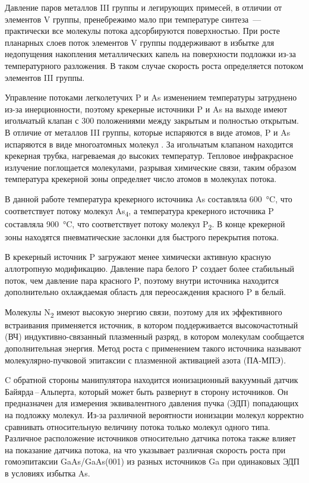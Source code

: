 Давление паров металлов III группы и легирующих примесей, в отличии от элементов V группы, пренебрежимо мало при температуре синтеза~--- практически все молекулы потока адсорбируются поверхностью. При росте планарных слоев поток элементов V группы поддерживают в избытке для недопущения накопления металлических капель на поверхности подложки из-за температурного разложения. В таком случае скорость роста определяется потоком элементов III группы.

Управление потоками легколетучих P и As изменением температуры затруднено из-за инерционности, поэтому крекерные источники P и As на выходе имеют игольчатый клапан с 300 положениями между закрытым и полностью открытым. В отличие от металлов III группы, которые испаряются в виде атомов, P и As испаряются в виде многоатомных молекул \cite{Neave1980}. За игольчатым клапаном находится крекерная трубка, нагреваемая до высоких температур. Тепловое инфракрасное излучение поглощается молекулами, разрывая химические связи, таким образом температура крекерной зоны определяет число атомов в молекулах потока.

В данной работе температура крекерного источника As составляла 600~\si{\degreeCelsius}, что соответствует потоку молекул As\textsubscript{4}, а температура крекерного источника P составляла 900~\si{\degreeCelsius}, что соответствует потоку молекул P\textsubscript{2}. В конце крекерной зоны находятся пневматические заслонки для быстрого перекрытия потока.

В крекерный источник P загружают менее химически активную красную аллотропную модификацию. Давление пара белого P создает более стабильный поток, чем давление пара красного P, поэтому внутри источника находится дополнительно охлаждаемая область для переосаждения красного P в белый.

Молекулы N\textsubscript{2} имеют высокую энергию связи, поэтому для их эффективного встраивания применяется источник, в котором поддерживается высокочастотный (ВЧ) индуктивно-связанный плазменный разряд, в котором молекулам сообщается дополнительная энергия. Метод роста с применением такого источника называют молекулярно-пучковой эпитаксии с плазменной активацией азота (ПА-МПЭ).

C обратной стороны манипулятора находится ионизационный вакуумный датчик Байярда\,--\,Альперта, который может быть развернут в сторону источников. Он предназначен для измерения эквивалентного давления пучка (ЭДП) попадающих на подложку молекул. Из-за различной вероятности ионизации молекул корректно сравнивать относительную величину потока только молекул одного типа. Различное расположение источников относительно датчика потока также влияет на показание датчика потока, на что указывает различная скорость роста при гомоэпитаксии GaAs/GaAs(001) из разных источников Ga при одинаковых ЭДП в условиях избытка As.

